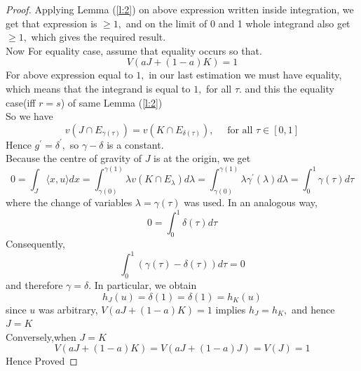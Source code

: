 \documentclass[oneside]{book}
\begin{document}
\begin{proof}
		Applying Lemma (\ref{l:2}) on above expression written inside integration, we get that expression is $\geq 1,$ and on the limit of 0 and 1 whole integrand also get  $\geq 1,$ which gives the required result.
		\\
		Now For equality case, assume that equality occurs so that.
		\[
		V(a J+(1-a) K) = 1 
		\]
		For above expression equal to $1,$ in our last estimation we must have equality, which means that the integrand  is equal to $1,$ for all $\tau .
		$ and this the equality case(iff $r = s$) of same Lemma (\ref{l:2})
		\\
		So we have 
		\[
		v\left(J \cap                E_{\gamma(\tau)}\right)=v\left(K \cap E_{\delta(\tau)}\right), \quad \text { for all } \tau \in[0,1]
		\]
		Hence $g^{\prime}= \delta^{\prime},$ so $\gamma- \delta$ is a constant.\\
		Because the centre of gravity of $J$ is at the origin, we get 
		\\
		\[
		0=\int_{J}\langle x, u\rangle d x=\int_{\gamma(0)}^{\gamma(1)} \lambda v\left(K \cap E_{\lambda}\right) d \lambda=\int_{\gamma(0)}^{\gamma(1)} \lambda \gamma^{\prime}(\lambda) d \lambda=\int_{0}^{1} \gamma(\tau) d \tau
		\]
		where the change of variables $\lambda=\gamma(\tau)$ was used. In an analogous way,
		\[
		0=\int_{0}^{1} \delta(\tau) d \tau
		\]
		Consequently,
		\[
		\int_{0}^{1}(\gamma(\tau)-\delta(\tau)) d \tau=0
		\]
		and therefore $\gamma=\delta .$ In particular, we obtain
		\[
		h_{J}(u)=\delta(1)=\delta(1)=h_{K}(u)
		\]
		since $u$ was arbitrary, $V(a J+(1-a) K)=1$ implies $h_{J}=h_{K},$ and hence $J=K$ \\
		Conversely,when $J=K$ 
		$$V(a J+(1-a) K)=V(a J+(1-a) J) =  V(J) = 1 $$
		Hence Proved
	\end{proof}
	\hfill \break
	
\end{document}
